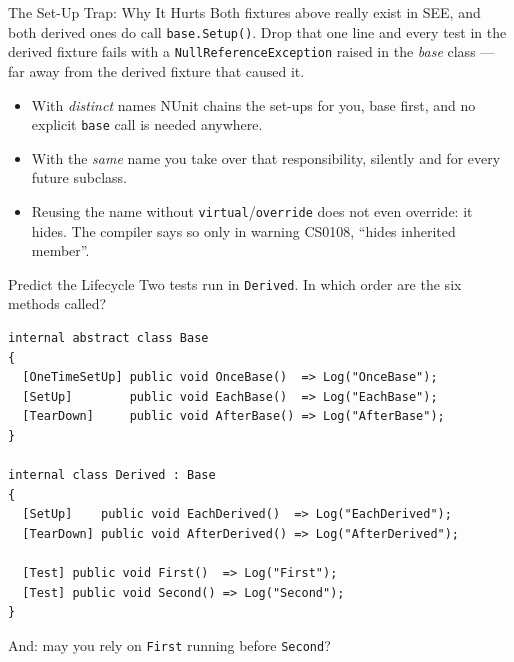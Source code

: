 \begin{frame}{The Set-Up Trap: Why It Hurts}
  Both fixtures above really exist in SEE, and both derived ones do call
  \texttt{base.Setup()}. Drop that one line and every test in the derived
  fixture fails with a \texttt{NullReferenceException} raised in the
  \emph{base} class --- far away from the derived fixture that caused it.
  \vspace{1ex}

  \begin{itemize}
    \item With \emph{distinct} names NUnit chains the set-ups for you, base
      first, and no explicit \texttt{base} call is needed anywhere.
    \item With the \emph{same} name you take over that responsibility, silently
      and for every future subclass.
    \item Reusing the name without \texttt{virtual}/\texttt{override} does not
      even override: it hides. The compiler says so only in warning CS0108,
      ``hides inherited member''.
  \end{itemize}
  \vspace{2ex}

\end{frame}

\begin{exerciseframe}{Predict the Lifecycle}
  Two tests run in \texttt{Derived}. In which order are the six methods called?
  \vspace{1ex}

  \begin{lstlisting}[basicstyle=\scriptsize\ttfamily]
internal abstract class Base
{
  [OneTimeSetUp] public void OnceBase()  => Log("OnceBase");
  [SetUp]        public void EachBase()  => Log("EachBase");
  [TearDown]     public void AfterBase() => Log("AfterBase");
}

internal class Derived : Base
{
  [SetUp]    public void EachDerived()  => Log("EachDerived");
  [TearDown] public void AfterDerived() => Log("AfterDerived");

  [Test] public void First()  => Log("First");
  [Test] public void Second() => Log("Second");
}
  \end{lstlisting}
  \vspace{1ex}

  And: may you rely on \texttt{First} running before \texttt{Second}?
\end{exerciseframe}

